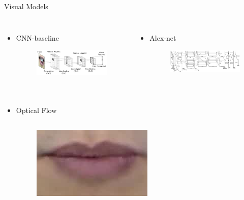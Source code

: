 \documentclass[xcolor=table]{beamer}
\begin{document}
\begin{frame}{Visual Models}
    \begin{columns}[T]
    \begin{itemize}
        \item CNN-baseline
        \begin{figure}
        \includegraphics[width=.9\textwidth]{fig/cnnOriginal.jpg}   
        \end{figure}
    \end{itemize}
    \begin{itemize}
        \item Alex-net 
        \begin{figure}
        \includegraphics[width=.9\textwidth]{fig/alexNet.jpg}   
        \end{figure}
    \end{itemize}
    \end{columns}
    \begin{columns}[T]
    \column{\textwidth}
    \begin{itemize}
        \item Optical Flow 
        \begin{columns}[T]
            \begin{figure}
            \includegraphics[width=\textwidth]{fig/opti0.jpeg}   

\end{figure}
\end{columns}
\end{itemize}
\end{columns}
\end{frame}
\end{document}
